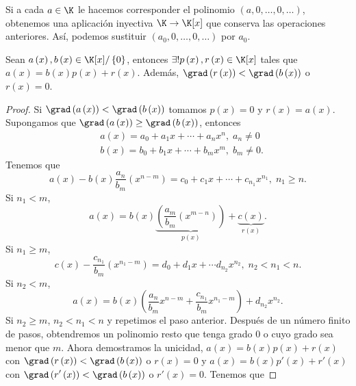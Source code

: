 Si a cada $\displaystyle a \in \K $ le hacemos corresponder el polinomio $\displaystyle \left(a, 0, \ldots, 0, \ldots\right) $, obtenemos una aplicación inyectiva $\displaystyle \K \to \K[x] $ que conserva las operaciones anteriores. Así, podemos sustituir $\displaystyle \left(a_{0}, 0, \ldots, 0, \ldots\right) $ por $\displaystyle a_{0} $. 
\begin{ftheorem}[]
	\normalfont Sean $\displaystyle a\left(x\right), b\left(x\right) \in \K[x]/ \left\{ 0\right\}  $, entonces $\displaystyle \exists!p\left(x\right), r\left(x\right) \in \K[x] $ tales que $\displaystyle a\left(x\right) = b\left(x\right)p\left(x\right)+r\left(x\right) $. Además, $\displaystyle \grad\left(r\left(x\right)\right) < \grad\left(b\left(x\right)\right) $ o $\displaystyle r\left(x\right) = 0 $. 
\end{ftheorem}
\begin{proof}
Si $\displaystyle \grad\left(a\left(x\right)\right) < \grad\left(b\left(x\right)\right) $ tomamos $\displaystyle p\left(x\right) = 0 $ y $\displaystyle r\left(x\right) = a\left(x\right) $. Supongamos que $\displaystyle \grad\left(a\left(x\right)\right) \geq \grad\left(b\left(x\right)\right) $, entonces
\[
\begin{split}
& a\left(x\right) = a_{0} + a_{1}x + \cdots + a_{n}x^{n}, \; a_{n} \neq 0\\
& b\left(x\right) = b_{0} + b_{1}x + \cdots + b_{m}x^{m}, \; b_{m} \neq 0.
\end{split}
\]
Tenemos que 
\[a\left(x\right)-b\left(x\right)\frac{a_{n}}{b_{m}}\left(x^{n-m}\right) = c_{0} + c_{1}x + \cdots + c_{n_{1}}x^{n_{1}}, \; n_{1}\geq n .\]
Si $\displaystyle n_{1} < m $,
\[a\left(x\right) = b\left(x\right) \underbrace{\left(\frac{a_{m}}{b_{m}}\left(x^{m -n}\right)\right)}_{p\left(x\right)} + \underbrace{c\left(x\right)}_{r\left(x\right)} .\]
Si $\displaystyle n_{1} \geq m $, 
\[ c\left(x\right) - \frac{c_{n_{1}}}{b_{m}}\left(x^{n_{1}-m}\right) = d _{0} + d _{1}x + \cdots d _{n_{2}}x^{n_{2}}, \; n_{2} < n_{1} < n .\]
Si $\displaystyle n_{2} < m $,
\[a\left(x\right) = b\left(x\right)\left(\frac{a_{n}}{b_{m}}x^{n - m} + \frac{c_{n_{1}}}{b_{m}}x^{n_{1}-m}\right) + d _{n_{2}}x^{n_{2}} .\]
Si $\displaystyle n_{2} \geq m $, $\displaystyle n_{2} < n_{1} < n $ y repetimos el paso anterior. Después de un número finito de pasos, obtendremos un polinomio resto que tenga grado 0 o cuyo grado sea menor que $\displaystyle m $. Ahora demostramos la unicidad, $\displaystyle a\left(x\right) = b\left(x\right) p\left(x\right) + r\left(x\right) $ con $\displaystyle \grad\left(r\left(x\right)\right) < \grad\left(b\left(x\right)\right) $ o $\displaystyle r\left(x\right) = 0 $ y $\displaystyle a\left(x\right) = b\left(x\right) p'\left(x\right) + r'\left(x\right) $ con $\displaystyle \grad\left(r'\left(x\right)\right) < \grad\left(b\left(x\right)\right) $ o $\displaystyle r'\left(x\right) = 0 $. Tenemos que

\end{proof}
